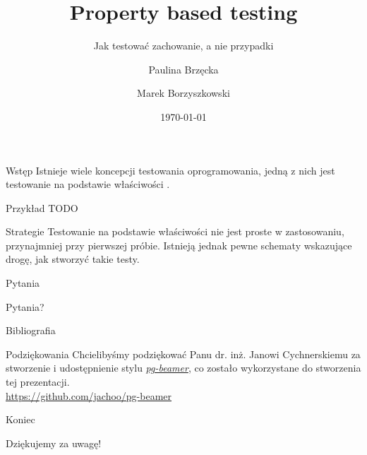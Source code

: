 \documentclass[polish,aspectratio=169]{beamer}
\title[Property based testing]{Property based testing}
\subtitle{Jak testować zachowanie, a nie przypadki}
\author{Paulina Brzęcka \and Marek Borzyszkowski}
\date{\today}
\begin{document}
\pgtitleframe



\begin{frame}{Wstęp}
    Istnieje wiele koncepcji testowania oprogramowania, jedną z nich jest testowanie na podstawie właściwości \cite{pbt_bib}.
\end{frame}

\begin{frame}{Przykład}
    TODO
\end{frame}

\begin{frame}{Strategie}
    Testowanie na podstawie właściwości nie jest proste w zastosowaniu, przynajmniej przy pierwszej próbie.
    Istnieją jednak pewne schematy wskazujące drogę, jak stworzyć takie testy.

\end{frame}


\begin{frame}{Pytania}
    \begin{center}
        {\huge Pytania?}
    \end{center}
\end{frame}

\begin{frame}[allowframebreaks]{Bibliografia}
    \printbibliography
\end{frame}

\begin{frame}{Podziękowania}
    Chcielibyśmy podziękować Panu dr. inż. Janowi Cychnerskiemu za stworzenie 
    i udostępnienie stylu \href{https://github.com/jachoo/pg-beamer}{\emph{pg-beamer}}, 
    co zostało wykorzystane do stworzenia tej prezentacji.\\
    \url{https://github.com/jachoo/pg-beamer}
     
\end{frame}

\begin{frame}{Koniec}
    \begin{center}
        {\huge Dziękujemy za uwagę!}
    \end{center}
\end{frame}

\pglastframe


\end{document}
